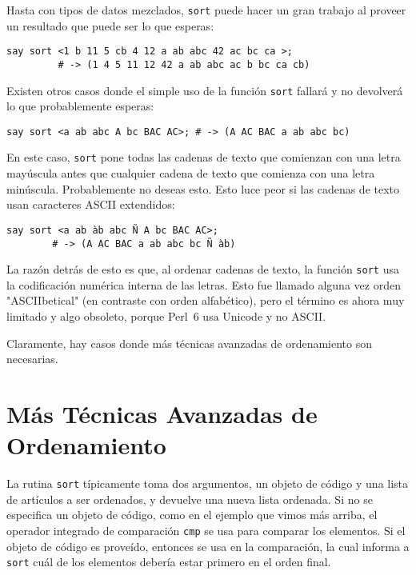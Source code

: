 Hasta con tipos de datos mezclados, {\tt sort} puede hacer 
un gran trabajo al proveer un resultado que puede ser lo que
esperas:

\begin{lstlisting}
say sort <1 b 11 5 cb 4 12 a ab abc 42 ac bc ca >;
         # -> (1 4 5 11 12 42 a ab abc ac b bc ca cb)
\end{lstlisting}

Existen otros casos donde el simple uso de la función
{\tt sort} fallará y no devolverá lo que probablemente
esperas:

\begin{lstlisting}
say sort <a ab abc A bc BAC AC>; # -> (A AC BAC a ab abc bc)
\end{lstlisting}
%

En este caso, {\tt sort} pone todas las cadenas de texto
que comienzan con una letra mayúscula antes que cualquier 
cadena de texto que comienza con una letra minúscula. Probablemente
no deseas esto. Esto luce peor si las cadenas de texto usan
caracteres ASCII extendidos:

\begin{lstlisting}
say sort <a ab àb abc Ñ A bc BAC AC>;
        # -> (A AC BAC a ab abc bc Ñ àb)
\end{lstlisting}
%

La razón detrás de esto es que, al ordenar cadenas de texto,
la función {\tt sort} usa la codificación numérica interna
de las letras. Esto fue llamado alguna vez orden 
"ASCIIbetical" (en contraste con orden alfabético),
pero el término es ahora muy limitado y algo obsoleto,
porque Perl~6 usa Unicode y no ASCII.

Claramente, hay casos donde más técnicas avanzadas 
de ordenamiento son necesarias.

\section{Más Técnicas Avanzadas de Ordenamiento}
\label{advanced_sort}

La rutina {\tt sort} típicamente toma dos argumentos,
un objeto de código y una lista de artículos a ser ordenados,
y devuelve una nueva lista ordenada. Si no se especifica un
objeto de código, como en el ejemplo que vimos más arriba,
el operador integrado de comparación {\tt cmp}
se usa para comparar los elementos. Si el objeto de código
es proveído, entonces se usa en la comparación,
la cual informa a {\tt sort} cuál de los elementos
debería estar primero en el orden final.

